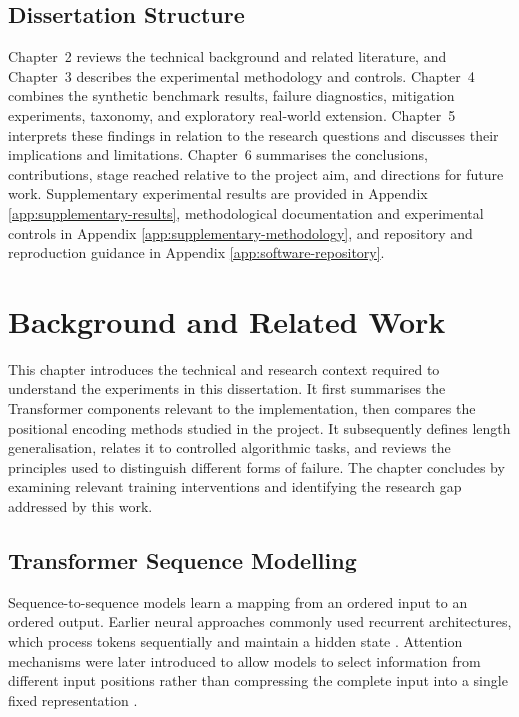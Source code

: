 \documentclass[
    author={Aanchala Ravindra Bhongade},
    supervisor={Dr. Fernando Moreno-Pino},
    degree={MSc},
    title={Length Generalisation in Transformer-Based Sequence Models: Failure Taxonomy and Mitigation Strategies},
    subtitle={},
    type={},
    year={2026}
]{dissertation}
\begin{document}
\section{Dissertation Structure}
\label{sec:dissertation_structure}

Chapter~2 reviews the technical background and related literature, and Chapter~3 describes the experimental methodology and controls.
Chapter~4 combines the synthetic benchmark results, failure diagnostics, mitigation experiments, taxonomy, and exploratory real-world extension. Chapter~5 interprets these findings in relation to the research questions and discusses their implications and limitations. Chapter~6 summarises the conclusions, contributions, stage reached relative to the project aim, and directions for future work. Supplementary experimental results are provided in
Appendix \ref{app:supplementary-results}, methodological documentation and experimental controls in Appendix \ref{app:supplementary-methodology}, and repository and reproduction guidance in Appendix \ref{app:software-repository}.

\chapter{Background and Related Work}
\label{chap:background}

\noindent
This chapter introduces the technical and research context required to understand the experiments in this dissertation. It first summarises the Transformer components relevant to the implementation, then compares the positional encoding methods studied in the project. It subsequently defines length generalisation, relates it to controlled algorithmic tasks, and reviews the principles used to distinguish different forms of failure. The chapter concludes by examining relevant training interventions and identifying the research gap addressed by this work.

\section{Transformer Sequence Modelling}

Sequence-to-sequence models learn a mapping from an ordered input to an ordered output. Earlier neural approaches commonly used recurrent architectures, which process tokens sequentially and maintain a hidden state \cite{sutskever2014sequence}. Attention mechanisms were later introduced to allow models to select information from different input positions rather than compressing the complete input into a single fixed representation \cite{bahdanau2015neural}.
\end{document}
